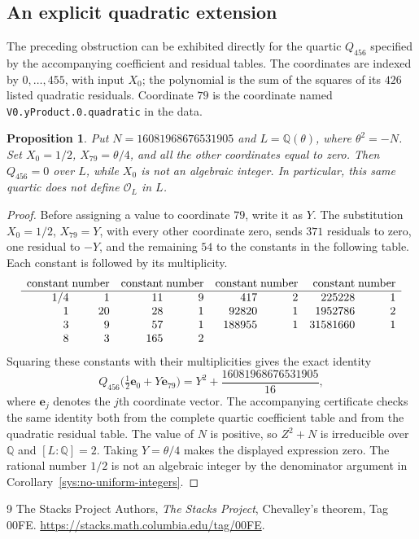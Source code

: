 \documentclass[11pt,a4paper]{article}
\newtheorem{proposition}[theorem]{Proposition}
\theoremstyle{definition}
\begin{document}
\subsection*{An explicit quadratic extension}

The preceding obstruction can be exhibited directly for the quartic
$Q_{456}$ specified by the accompanying coefficient and residual
tables. The coordinates are indexed by $0,\ldots,455$, with input
$X_0$; the polynomial is the sum of the squares of its $426$
listed quadratic residuals. Coordinate $79$ is the coordinate
named \texttt{V0.yProduct.0.quadratic} in the data.

\begin{proposition}\label{sys:explicit-quartic-extension}
Put $N=16081968676531905$ and
$L=\mathbb Q(\theta)$, where $\theta^2=-N$.
Set $X_0=1/2$, $X_{79}=\theta/4$, and all the other
coordinates equal to zero. Then $Q_{456}=0$ over $L$, while
$X_0$ is not an algebraic integer. In particular, this same
quartic does not define $\mathcal O_L$ in $L$.
\end{proposition}
\begin{proof}
Before assigning a value to coordinate $79$, write it as $Y$.
The substitution $X_0=1/2$, $X_{79}=Y$, with every other
coordinate zero, sends $371$ residuals to zero, one residual
to $-Y$, and the remaining $54$ to the constants in the
following table. Each constant is followed by its multiplicity.
\[
\begin{array}{r@{\;}r@{\quad}r@{\;}r@{\quad}r@{\;}r@{\quad}r@{\;}r}
\text{constant}&\text{number}&\text{constant}&\text{number}&
\text{constant}&\text{number}&\text{constant}&\text{number}\\
\hline
1/4&1&11&9&417&2&225228&1\\
1&20&28&1&92820&1&1952786&2\\
3&9&57&1&188955&1&31581660&1\\
8&3&165&2&&&&
\end{array}
\]
Squaring these constants with their multiplicities gives the
exact identity
\[
 Q_{456}\bigl(\tfrac12\mathbf e_0+Y\mathbf e_{79}\bigr)
     =Y^2+\frac{16081968676531905}{16},
\]
where $\mathbf e_j$ denotes the $j$th coordinate vector.
The accompanying certificate checks the same identity both
from the complete quartic coefficient table and from the
quadratic residual table. The value of $N$ is positive, so
$Z^2+N$ is irreducible over $\mathbb Q$ and $[L:\mathbb Q]=2$.
Taking $Y=\theta/4$ makes the displayed expression zero.
The rational number $1/2$ is not an algebraic integer by the
denominator argument in Corollary~\ref{sys:no-uniform-integers}.
\end{proof}

\begin{thebibliography}{9}
The Stacks Project Authors, \emph{The Stacks Project},
Chevalley's theorem, Tag 00FE.
\url{https://stacks.math.columbia.edu/tag/00FE}.
\end{thebibliography}
\end{document}
